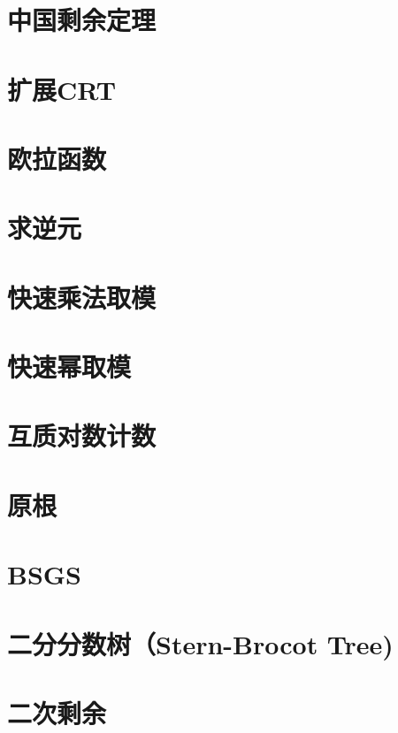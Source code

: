 \section{中国剩余定理}
\raggedbottom
\hrulefill
\section{扩展CRT}
\raggedbottom
\hrulefill
\section{欧拉函数}
\raggedbottom
\hrulefill
\section{求逆元}
\raggedbottom
\hrulefill
\section{快速乘法取模}
\raggedbottom
\hrulefill
\section{快速幂取模}
\raggedbottom
\hrulefill
\section{互质对数计数}
\raggedbottom
\hrulefill
\section{原根}
\raggedbottom
\hrulefill
\section{BSGS}
\raggedbottom
\hrulefill
\section{二分分数树（Stern-Brocot Tree)}
\raggedbottom
\hrulefill
\section{	二次剩余}
\raggedbottom
\hrulefill
